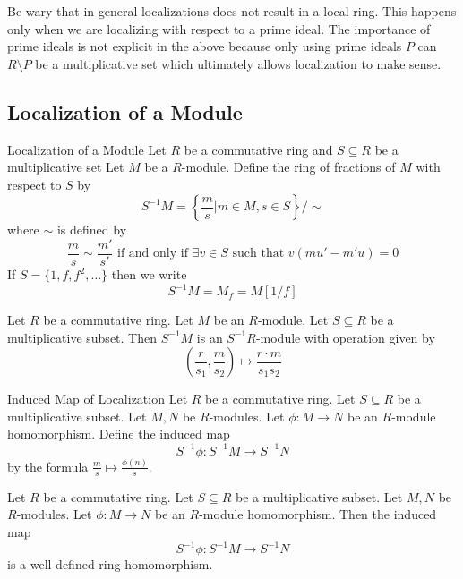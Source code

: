 \documentclass[a4paper]{article}
\begin{document}
Be wary that in general localizations does not result in a local ring. This happens only when we are localizing with respect to a prime ideal. The importance of prime ideals is not explicit in the above because only using prime ideals $P$ can $R\setminus P$ be a multiplicative set which ultimately allows localization to make sense. 

\subsection{Localization of a Module}
\begin{defn}{Localization of a Module}{} Let $R$ be a commutative ring and $S\subseteq R$ be a multiplicative set Let $M$ be a $R$-module. Define the ring of fractions of $M$ with respect to $S$ by $$S^{-1}M=\left\{\frac{m}{s}|m\in M,s\in S\right\}/\sim$$ where $\sim$ is defined by $$\frac{m}{s}\sim\frac{m'}{s'}\text{ if and only if }\exists v\in S\text{ such that }v(mu'-m'u)=0$$ If $S=\{1,f,f^2,\dots\}$ then we write $$S^{-1}M=M_f=M[1/f]$$
\end{defn}

\begin{lmm}{}{} Let $R$ be a commutative ring. Let $M$ be an $R$-module. Let $S\subseteq R$ be a multiplicative subset. Then $S^{-1}M$ is an $S^{-1}R$-module with operation given by $$\left(\frac{r}{s_1},\frac{m}{s_2}\right)\mapsto\frac{r\cdot m}{s_1s_2}$$
\end{lmm}

\begin{defn}{Induced Map of Localization}{} Let $R$ be a commutative ring. Let $S\subseteq R$ be a multiplicative subset. Let $M,N$ be $R$-modules. Let $\phi:M\to N$ be an $R$-module homomorphism. Define the induced map $$S^{-1}\phi:S^{-1}M\to S^{-1}N$$ by the formula $\frac{m}{s}\mapsto\frac{\phi(n)}{s}$. 
\end{defn}

\begin{lmm}{}{} Let $R$ be a commutative ring. Let $S\subseteq R$ be a multiplicative subset. Let $M,N$ be $R$-modules. Let $\phi:M\to N$ be an $R$-module homomorphism. Then the induced map $$S^{-1}\phi:S^{-1}M\to S^{-1}N$$ is a well defined ring homomorphism. 
\end{lmm}
\end{document}
